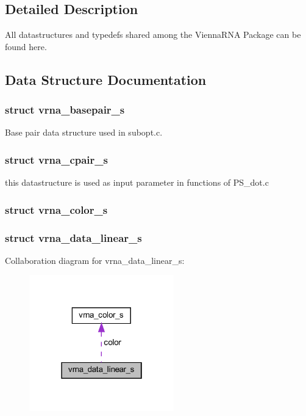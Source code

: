 \subsection{Detailed Description}
All datastructures and typedefs shared among the Vienna\+R\+NA Package can be found here. 



\subsection{Data Structure Documentation}
\label{structvrna__basepair__s}
\subsubsection{struct vrna\+\_\+basepair\+\_\+s}
Base pair data structure used in subopt.\+c. \label{structvrna__cpair__s}
\subsubsection{struct vrna\+\_\+cpair\+\_\+s}
this datastructure is used as input parameter in functions of P\+S\+\_\+dot.\+c \label{structvrna__color__s}
\subsubsection{struct vrna\+\_\+color\+\_\+s}
\label{structvrna__data__linear__s}
\subsubsection{struct vrna\+\_\+data\+\_\+linear\+\_\+s}


Collaboration diagram for vrna\+\_\+data\+\_\+linear\+\_\+s\+:
\nopagebreak
\begin{figure}[H]
\begin{center}
\leavevmode
\includegraphics[width=178pt]{structvrna__data__linear__s__coll__graph}
\end{center}
\end{figure}
\label{structvrna__sect__s}
